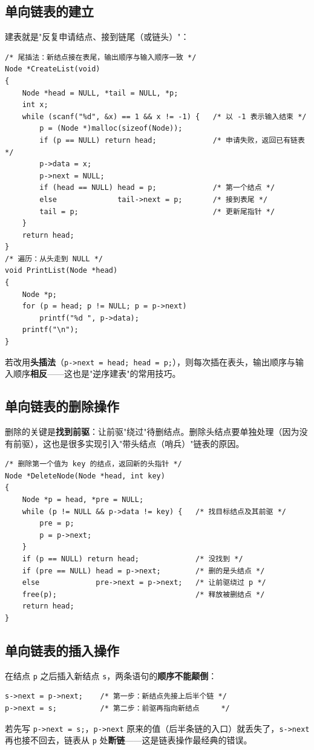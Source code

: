 \subsection{单向链表的建立}
建表就是"反复申请结点、接到链尾（或链头）"：
\begin{lstlisting}
/* 尾插法：新结点接在表尾，输出顺序与输入顺序一致 */
Node *CreateList(void)
{
    Node *head = NULL, *tail = NULL, *p;
    int x;
    while (scanf("%d", &x) == 1 && x != -1) {   /* 以 -1 表示输入结束 */
        p = (Node *)malloc(sizeof(Node));
        if (p == NULL) return head;             /* 申请失败，返回已有链表 */
        p->data = x;
        p->next = NULL;
        if (head == NULL) head = p;             /* 第一个结点 */
        else              tail->next = p;       /* 接到表尾 */
        tail = p;                               /* 更新尾指针 */
    }
    return head;
}
/* 遍历：从头走到 NULL */
void PrintList(Node *head)
{
    Node *p;
    for (p = head; p != NULL; p = p->next)
        printf("%d ", p->data);
    printf("\n");
}
\end{lstlisting}
若改用\textbf{头插法}（\texttt{p->next = head; head = p;}），则每次插在表头，输出顺序与输入顺序\textbf{相反}——这也是"逆序建表"的常用技巧。

\subsection{单向链表的删除操作}
删除的关键是\textbf{找到前驱}：让前驱"绕过"待删结点。删除头结点要单独处理（因为没有前驱），这也是很多实现引入"带头结点（哨兵）"链表的原因。
\begin{lstlisting}
/* 删除第一个值为 key 的结点，返回新的头指针 */
Node *DeleteNode(Node *head, int key)
{
    Node *p = head, *pre = NULL;
    while (p != NULL && p->data != key) {   /* 找目标结点及其前驱 */
        pre = p;
        p = p->next;
    }
    if (p == NULL) return head;             /* 没找到 */
    if (pre == NULL) head = p->next;        /* 删的是头结点 */
    else             pre->next = p->next;   /* 让前驱绕过 p */
    free(p);                                /* 释放被删结点 */
    return head;
}
\end{lstlisting}

\subsection{单向链表的插入操作}
在结点 \texttt{p} 之后插入新结点 \texttt{s}，两条语句的\textbf{顺序不能颠倒}：
\begin{lstlisting}
s->next = p->next;    /* 第一步：新结点先接上后半个链 */
p->next = s;          /* 第二步：前驱再指向新结点     */
\end{lstlisting}
若先写 \texttt{p->next = s;}，\texttt{p->next} 原来的值（后半条链的入口）就丢失了，\texttt{s->next} 再也接不回去，链表从 \texttt{p} 处\textbf{断链}——这是链表操作最经典的错误。


